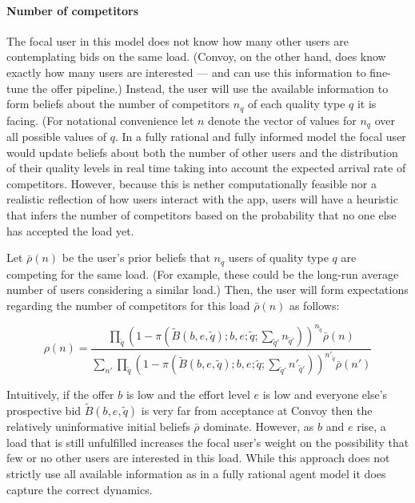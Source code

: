 \documentclass[12pt]{article}
\begin{document}
\paragraph{Number of competitors}
The focal user in this model does not know how many other users are contemplating bids on the same load. (Convoy, on the other hand, does know exactly how many users are interested --- and can use this information to fine-tune the offer pipeline.) Instead, the user will use the available information to form beliefs about the number of competitors $n_q$ of each quality type $q$ it is facing. (For notational convenience let $n$ denote the vector of values for $n_q$ over all possible values of $q$. In a fully rational and fully informed model the focal user would update beliefs about both the number of other users and the distribution of their quality levels in real time taking into account the expected arrival rate of competitors. However, because this is nether computationally feasible nor a realistic reflection of how users interact with the app, users will have a heuristic that infers the number of competitors based on the probability that no one else has accepted the load yet.

Let $\bar{\rho}\left(n\right)$ be the user's prior beliefs that $n_q$ users of quality type $q$ are competing for the same load. (For example, these could be the long-run average number of users considering a similar load.) Then, the user will form expectations regarding the number of competitors for this load $\bar{\rho}\left(n\right)$ as follows:

\begin{equation*}
    \rho\left(n\right) = \frac{ \prod_{\tilde{q}} \left(1-\pi\left(\tilde{B}\left(b,e,\tilde{q}\right); b, e; \tilde{q}; \sum_{\tilde{q}'} n_{\tilde{q}'} \right)\right)^{n_{\tilde{q}}}  \bar{\rho}\left(n\right)}{\sum_{n'} \prod_{\tilde{q}} \left(1-\pi\left(\tilde{B}\left(b,e,\tilde{q}\right); b, e; \tilde{q}; \sum_{\tilde{q}'} n'_{\tilde{q}'} \right)\right)^{n'_{\tilde{q}}} \bar{\rho}\left(n'\right)}
\end{equation*}

Intuitively, if the offer $b$ is low and the effort level $e$ is low and everyone else's prospective bid $\tilde{B}\left(b,e,\tilde{q}\right)$ is very far from acceptance at Convoy then the relatively uninformative initial beliefs $\bar{\rho}$ dominate. However, as $b$ and $e$ rise, a load that is still unfulfilled increases the focal user's weight on the possibility that few or no other users are interested in this load. While this approach does not strictly use all available information as in a fully rational agent model it does capture the correct dynamics.
\end{document}
